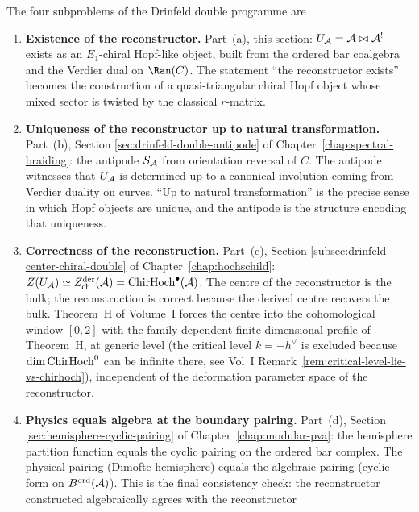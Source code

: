 \begin{remark}
\label{rem:drinfeld-programme-four-conditions}
The four subproblems of the Drinfeld double programme are
\begin{enumerate}[label=\textup{(\alph*)},leftmargin=2em]
\item \textbf{Existence of the reconstructor.}
Part~(a), this section: $U_{\mathcal{A}} = \mathcal{A} \bowtie \mathcal{A}^!$ exists as
an $E_1$-chiral Hopf-like object, built from the ordered bar
coalgebra and the Verdier dual on $\Ran(C)$. The statement
``the reconstructor exists'' becomes the construction of a
quasi-triangular chiral Hopf object whose mixed sector is
twisted by the classical $r$-matrix.
\item \textbf{Uniqueness of the reconstructor up to natural
transformation.} Part~(b), Section
\textup{\ref{sec:drinfeld-double-antipode}} of
Chapter~\textup{\ref{chap:spectral-braiding}}: the antipode
$S_{\mathcal{A}}$ from orientation reversal of $C$. The antipode witnesses
that $U_{\mathcal{A}}$ is determined up to a canonical involution coming
from Verdier duality on curves. ``Up to natural transformation''
is the precise sense in which Hopf objects are unique, and the
antipode is the structure encoding that uniqueness.
\item \textbf{Correctness of the reconstruction.} Part~(c),
Section \textup{\ref{subsec:drinfeld-center-chiral-double}} of
Chapter~\textup{\ref{chap:hochschild}}: $Z(U_{\mathcal{A}})\simeq
Z^{\mathrm{der}}_{\mathrm{ch}}(\mathcal{A}) = \mathrm{ChirHoch}^\bullet(\mathcal{A})$.
The centre of the reconstructor is the bulk; the reconstruction
is correct because the derived centre recovers the bulk.
Theorem~H of Volume~I forces the centre into the cohomological
window $[0,2]$ with the family-dependent finite-dimensional profile
of Theorem~H, at generic
level (the critical level $k = -h^\vee$ is excluded because
$\dim \mathrm{ChirHoch}^0$ can be infinite there, see Vol~I
Remark~\ref*{rem:critical-level-lie-vs-chirhoch}), independent
of the deformation parameter space of the reconstructor.
\item \textbf{Physics equals algebra at the boundary pairing.}
Part~(d), Section \textup{\ref{sec:hemisphere-cyclic-pairing}}
of Chapter~\textup{\ref{chap:modular-pva}}: the hemisphere
partition function equals the cyclic pairing on the ordered bar
complex. The physical pairing (Dimofte hemisphere) equals the
algebraic pairing (cyclic form on $B^{\mathrm{ord}}(\mathcal{A})$).
This is the final consistency check: the reconstructor
constructed algebraically agrees with the reconstructor

\end{enumerate}
\end{remark}
